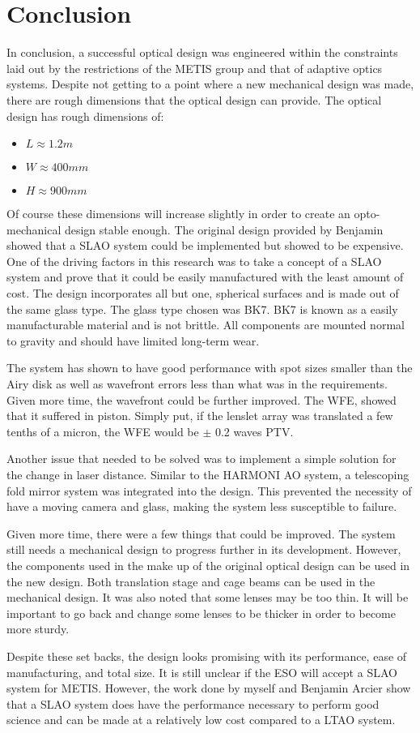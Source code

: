\chapter{Conclusion} %

In conclusion, a successful optical design was engineered within the constraints laid
out by the restrictions of the METIS group and that of adaptive optics systems. 
Despite not getting to a point where a new mechanical design was made, there are rough
dimensions that the optical design can provide.  The optical design has rough dimensions of:

\begin{itemize}
    \item $L \approx 1.2m$
    \item $W \approx 400 mm$
    \item $H \approx 900mm$
\end{itemize}

Of course these dimensions will increase slightly in order to create an
opto-mechanical design stable enough.  The original design provided by Benjamin showed
that a SLAO system could be implemented but showed to be expensive.
One of the driving factors in this research was to take a concept of a SLAO system and
prove that it could be easily manufactured with the least amount of cost.  The design
incorporates all but one, spherical surfaces and is made out of the same glass type.
The glass type chosen was BK7.  BK7 is known as a easily manufacturable material and 
is not brittle.  All components are mounted normal to gravity and should have limited
long-term wear.

The system has shown to have good performance with spot sizes smaller than the Airy
disk as well as wavefront errors less than what was in the requirements.  Given more
time, the wavefront could be further improved.  The WFE, showed that it suffered in
piston.  Simply put, if the lenslet array was translated a few tenths of a micron, the
WFE would be $\pm$ 0.2 waves PTV.

Another issue that needed to be solved was to implement a simple solution for the
change in laser distance.  Similar to the HARMONI AO system, a telescoping fold mirror
system was integrated into the design.  This prevented the necessity of have a moving
camera and glass, making the system less susceptible to failure.

Given more time, there were a few things that could be improved.  The system still
needs a mechanical design to progress further in its development.  However, the
components used in the make up of the original optical design can be used in the new
design.  Both translation stage and cage beams can be used in the mechanical design. 
It was also noted that some lenses may be too thin.  It will be important to go back
and change some lenses to be thicker in order to become more sturdy.

Despite these set backs, the design looks promising with its performance, ease of
manufacturing, and total size.  It is still unclear if the ESO will accept a SLAO
system for METIS.  However, the work done by myself and Benjamin Arcier show that
a SLAO system does have the performance necessary to perform good science and can
be made at a relatively low cost compared to a LTAO system.  